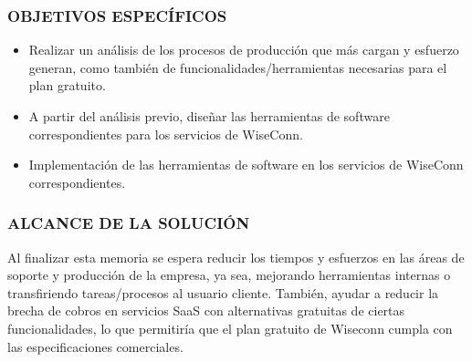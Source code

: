 \subsubsection{OBJETIVOS ESPECÍFICOS}
\begin{itemize}
    \item Realizar un análisis de los procesos de producción que más cargan y esfuerzo generan, como también de funcionalidades/herramientas necesarias para el plan gratuito.
    \item A partir del análisis previo, diseñar las herramientas de software correspondientes para los servicios de WiseConn.
    \item Implementación de las herramientas de software en los servicios de WiseConn correspondientes.
\end{itemize}

\subsubsection{ALCANCE DE LA SOLUCIÓN}
Al finalizar esta memoria se espera reducir los tiempos y esfuerzos en las áreas de soporte y producción de la empresa, ya sea, mejorando herramientas internas o transfiriendo tareas/procesos al usuario cliente. También, ayudar a reducir la brecha de cobros en servicios SaaS con alternativas gratuitas de ciertas funcionalidades, lo que permitiría que el plan gratuito de Wiseconn cumpla con las especificaciones comerciales.
